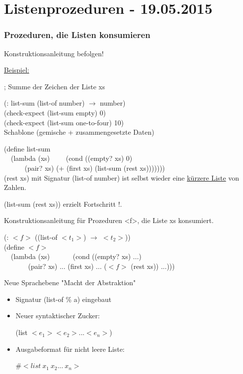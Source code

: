 \documentclass[a4paper, 20pt, openany]{book}
\begin{document}
\chapter{Listenprozeduren - 19.05.2015}
\subsection*{Prozeduren, die Listen konsumieren}

Konstruktionsanleitung befolgen!

\underline{Beispiel:}

; Summe der Zeichen der Liste xs

(: list-sum (list-of number) $\rightarrow$ number) \\
(check-expect (list-sum empty) 0) \\
(check-expect (list-sum one-to-four) 10) \\

Schablone (gemische + zusammengesetzte Daten)

(define list-sum \\
\ \ (lambda (xs)
\ \ \ \ (cond ((empty? xs) 0) \\
\ \ \ \ \ \ (pair? xs) (+ (first xs) (list-sum (rest xs))))))) \\

(rest xs) mit Signatur (list-of number) ist selbst wieder eine \underline{kürzere Liste} von Zahlen. 

(list-sum (rest xs)) erzielt Fortschritt !.

Konstruktionsanleitung für Prozeduren <f>, die Liste xs konsumiert.

(: $<f>$ ((list-of $<t_1>$) $\rightarrow$ $<t_2>$))  \\
(define $<f>$ \\
\ \ (lambda (xs) \ \
\ \ \ \ (cond ((empty? xs) ...) \\
\ \ \ \ \ \ \ (pair? xs) ... (first xs) ... ($<f>$ (rest xs)) ...)))

Neue Sprachebene "Macht der Abstraktion"

\begin{itemize}
  \item Signatur (list-of \% a) eingebaut
  \item Neuer syntaktischer Zucker:
  
  (list $<e_1> <e_2> ... <e_n>$)
  
  \item Ausgabeformat für nicht leere Liste:
  
  \#$<list \ x_1 \ x_2 ... \ x_n >$
\end{itemize}
\end{document}
